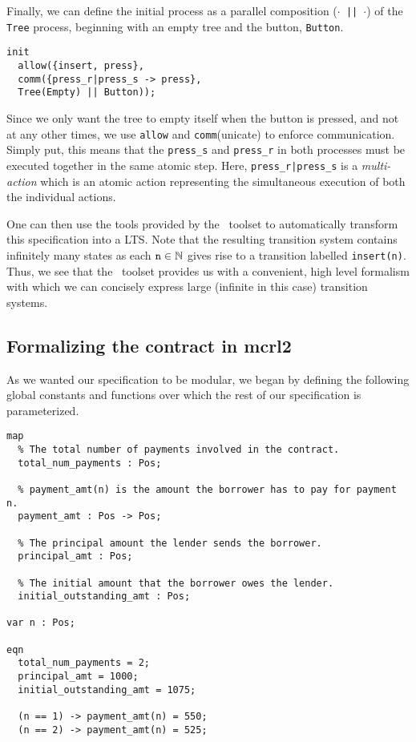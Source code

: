 \documentclass{article}
\begin{document}
Finally, we can define the initial process as a parallel composition
(\texttt{$\cdot$ || $\cdot$}) of the \texttt{Tree} process, beginning with an
empty tree and the button, \texttt{Button}.

\begin{verbatim}
init
  allow({insert, press},
  comm({press_r|press_s -> press},
  Tree(Empty) || Button));
\end{verbatim}

Since we only want the tree to empty itself when the button is pressed, and
not at any other times, we use \texttt{allow} and \texttt{comm}(unicate) to
enforce communication.
Simply put, this means that the \texttt{press\_s} and \texttt{press\_r} in both
processes must be executed together in the same atomic step.
Here, \texttt{press\_r|press\_s} is a \textit{multi-action} which is an atomic
action representing the simultaneous execution of both the individual actions.

One can then use the tools provided by the \mcrl \, toolset to automatically
transform this specification into a LTS.
Note that the resulting transition system contains infinitely many states as
each $\mathtt{n} \in \operatorname{\mathbb{N}}$ gives rise to a transition labelled \texttt{insert(n)}.
Thus, we see that the \mcrl \, toolset provides us with a convenient, high level
formalism with which we can concisely express large (infinite in this case)
transition systems.

\subsection{Formalizing the contract in mcrl2}
As we wanted our specification to be modular, we began by defining the
following global constants and functions over which the rest of our
specification is parameterized.

\begin{verbatim}
map
  % The total number of payments involved in the contract.
  total_num_payments : Pos;

  % payment_amt(n) is the amount the borrower has to pay for payment n.
  payment_amt : Pos -> Pos;

  % The principal amount the lender sends the borrower.
  principal_amt : Pos;

  % The initial amount that the borrower owes the lender.
  initial_outstanding_amt : Pos;

var n : Pos;

eqn
  total_num_payments = 2;
  principal_amt = 1000;
  initial_outstanding_amt = 1075;

  (n == 1) -> payment_amt(n) = 550;
  (n == 2) -> payment_amt(n) = 525;
\end{verbatim}
\end{document}
